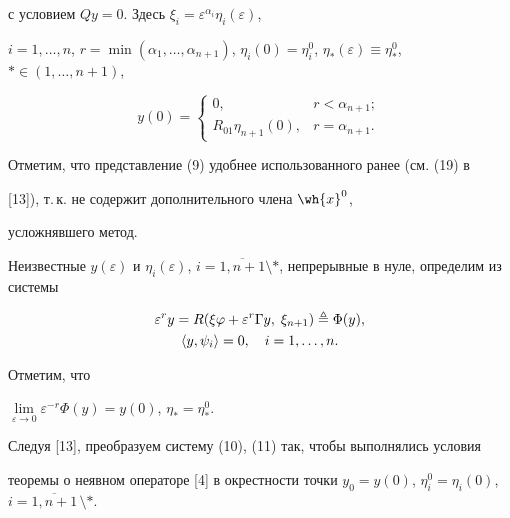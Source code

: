 с условием $Qy = 0$. Здесь $\xi_i =


\varepsilon^{\alpha_i}\eta_i(\varepsilon)$,


$i=1,\dotsc,n$, $r = \min (\alpha_1,\dotsc,\alpha_{n+1})$, $\eta_i(0) =


\eta_i^0$, $\eta_*(\varepsilon) \equiv \eta^0_*$, $*\in(1,\dotsc,n+1)$,


$$


y(0) =


\begin{cases}


0, & r<\alpha_{n+1};\\


R_{01}\eta_{n+1}(0), & r = \alpha_{n+1}.


\end{cases}


$$





Отметим, что представление (9) удобнее использованного ранее (см. (19) в


[13]), т.\,к. не содержит дополнительного члена $\wh{x}^0$,


усложнявшего метод.


Неизвестные $y(\varepsilon)$ и $\eta_i(\varepsilon)$, $i =


\overline{1,n+1}\setminus *$, непрерывные в нуле, определим из системы


\begin{gather}


\varepsilon^r y = R(\xi\varphi + \varepsilon^r\Gamma y,\; \xi_{n+1})


\triangleq \Phi(y), \\


%


\la y,\psi_i\ra = 0, \quad i=1,\dotsc,n.


\end{gather}





Отметим, что


$\lim\limits_{\varepsilon\to 0}\varepsilon^{-r}\Phi(y) = y(0)$, $\eta_* =


\eta^0_*$.


Следуя [13], преобразуем систему (10), (11) так, чтобы выполнялись условия


теоремы о неявном операторе [4] в окрестности точки $y_0 = y(0)$, $\eta^0_i


= \eta_i(0)$, $i =\overline{1,n+1}\,\setminus *$.





